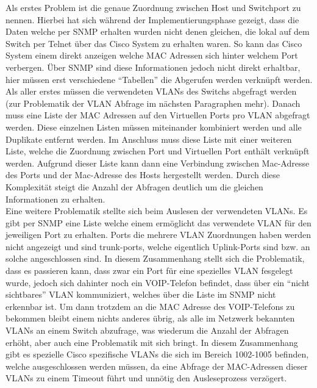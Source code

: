 Als erstes Problem ist die genaue Zuordnung zwischen Host und Switchport zu nennen.
Hierbei hat sich während der Implementierungsphase gezeigt, dass die Daten welche per SNMP erhalten wurden nicht denen gleichen, die lokal auf dem Switch per Telnet über das Cisco System zu erhalten waren. So kann das Cisco System einem direkt anzeigen welche MAC Adressen sich hinter welchem Port verbergen. Über SNMP sind diese Informationen jedoch nicht direkt erhaltbar, hier müssen erst verschiedene “Tabellen” die Abgerufen werden verknüpft werden. Als aller erstes müssen die verwendeten VLANs des Switchs abgefragt werden (zur Problematik der VLAN Abfrage im nächsten Paragraphen mehr). Danach muss eine Liste der MAC Adressen auf den Virtuellen Ports pro VLAN abgefragt werden. Diese einzelnen Listen müssen miteinander kombiniert werden und alle Duplikate entfernt werden. Im Anschluss muss diese Liste mit einer weiteren Liste, welche die Zuordnung zwischen Port und Virtuellen Port enthält verknüpft werden. Aufgrund dieser Liste kann dann eine Verbindung zwischen Mac-Adresse des Ports und der Mac-Adresse des Hosts hergestellt werden. Durch diese Komplexität steigt die Anzahl der Abfragen deutlich um die gleichen Informationen zu erhalten.\\
Eine weitere Problematik stellte sich beim Auslesen der verwendeten VLANs. Es gibt per SNMP eine Liste welche einem ermöglicht das verwendete VLAN für den jeweiligen Port zu erhalten. Ports die mehrere VLAN Zuordnungen haben werden nicht angezeigt und sind trunk-ports, welche eigentlich Uplink-Ports sind bzw. an solche angeschlossen sind. In diesem Zusammenhang stellt sich die Problematik, dass es passieren kann, dass zwar ein Port für eine spezielles VLAN fesgelegt wurde, jedoch sich dahinter noch ein VOIP-Telefon befindet, dass über ein “nicht sichtbares” VLAN kommuniziert, welches über die Liste im SNMP nicht erkennbar ist. Um dann trotzdem an die MAC Adresse des VOIP-Telefons zu bekommen bleibt einem nichts anderes übrig, als alle im Netzwerk bekannten VLANs an einem Switch abzufrage, was wiederum die Anzahl der Abfragen erhöht, aber auch eine Problematik mit sich bringt. In diesem Zusammenhang gibt es spezielle Cisco spezifische VLANs die sich im Bereich 1002-1005 befinden, welche ausgeschlossen werden müssen, da eine Abfrage der MAC-Adressen dieser VLANs zu einem Timeout führt und unnötig den Ausleseprozess verzögert.\\
